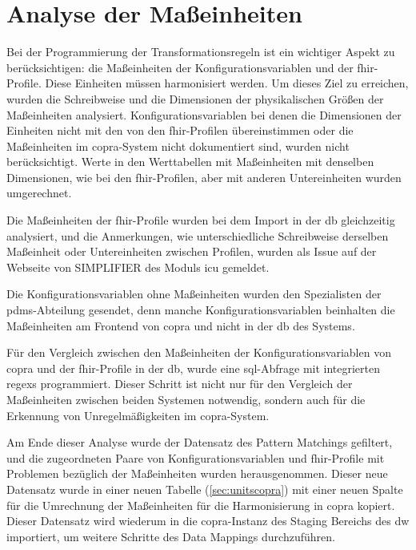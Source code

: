 \section{Analyse der Maßeinheiten} \label{sec:units}

Bei der Programmierung der Transformationsregeln ist ein wichtiger Aspekt zu berücksichtigen: die Maßeinheiten der Konfigurationsvariablen und der \ac{fhir}-Profile. Diese Einheiten müssen harmonisiert werden. Um dieses Ziel zu erreichen, wurden die Schreibweise und die Dimensionen der physikalischen Größen der Maßeinheiten analysiert. Konfigurationsvariablen bei denen die Dimensionen der Einheiten nicht mit den von den \ac{fhir}-Profilen übereinstimmen oder die Maßeinheiten im \ac{copra}-System nicht dokumentiert sind, wurden nicht berücksichtigt. Werte in den Werttabellen mit Maßeinheiten mit denselben Dimensionen, wie bei den \ac{fhir}-Profilen, aber mit anderen Untereinheiten wurden umgerechnet.

Die Maßeinheiten der \ac{fhir}-Profile wurden bei dem Import in der \ac{db} gleichzeitig analysiert, und die Anmerkungen, wie unterschiedliche Schreibweise derselben Maßeinheit oder Untereinheiten zwischen Profilen, wurden als Issue auf der Webseite von SIMPLIFIER des Moduls \glqq\ac{icu}\grqq{} gemeldet.

Die Konfigurationsvariablen ohne Maßeinheiten wurden den Spezialisten der \ac{pdms}-Abteilung gesendet, denn manche Konfigurationsvariablen beinhalten die Maßeinheiten am Frontend von \ac{copra} und nicht in der \ac{db} des Systems.

Für den Vergleich zwischen den Maßeinheiten der Konfigurationsvariablen von \ac{copra} und der \ac{fhir}-Profile in der \ac{db}, wurde eine \ac{sql}-Abfrage mit integrierten \acp{regex} programmiert. Dieser Schritt ist nicht nur für den Vergleich der Maßeinheiten zwischen beiden Systemen notwendig, sondern auch für die Erkennung von Unregelmäßigkeiten im \ac{copra}-System.

Am Ende dieser Analyse wurde der Datensatz des Pattern Matchings gefiltert, und die zugeordneten Paare von Konfigurationsvariablen und \ac{fhir}-Profile mit Problemen bezüglich der Maßeinheiten wurden herausgenommen. Dieser neue Datensatz wurde in einer neuen Tabelle (\ref{sec:unitscopra}) mit einer neuen Spalte für die Umrechnung der Maßeinheiten für die Harmonisierung in \ac{copra} kopiert. Dieser Datensatz wird wiederum in die \ac{copra}-Instanz des Staging Bereichs des \ac{dw} importiert, um weitere Schritte des Data Mappings durchzuführen.